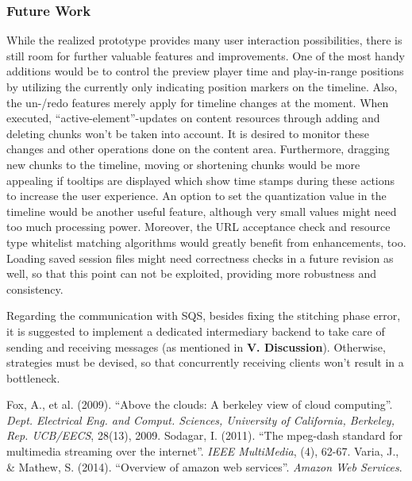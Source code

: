 \documentclass[conference]{IEEEtran}
\begin{document}
\subsubsection*{Future Work}
While the realized prototype provides many user interaction possibilities, there is still room for further valuable features and improvements.
One of the most handy additions would be to control the preview player time and play-in-range positions by utilizing the currently only indicating position markers on the timeline.
Also, the un-/redo features merely apply for timeline changes at the moment.
When executed, ``active-element''-updates on content resources through adding and deleting chunks won't be taken into account.
It is desired to monitor these changes and other operations done on the content area.
Furthermore, dragging new chunks to the timeline, moving or shortening chunks would be more appealing if tooltips are displayed which show time stamps during these actions to increase the user experience.
An option to set the quantization value in the timeline would be another useful feature, although very small values might need too much processing power.
Moreover, the URL acceptance check and resource type whitelist matching algorithms would greatly benefit from enhancements, too.
Loading saved session files might need correctness checks in a future revision as well, so that this point can not be exploited, providing more robustness and consistency.

Regarding the communication with SQS, besides fixing the stitching phase error, it is suggested to implement a dedicated intermediary backend to take care of sending and receiving messages (as mentioned in \textbf{V. Discussion}).
Otherwise, strategies must be devised, so that concurrently receiving clients won't result in a bottleneck.

\begin{thebibliography}{00}
 Fox, A., et al. (2009). ``Above the clouds: A berkeley view of cloud computing''. \textit{Dept. Electrical Eng. and Comput. Sciences, University of California, Berkeley, Rep. UCB/EECS}, 28(13), 2009. %
 Sodagar, I. (2011). ``The mpeg-dash standard for multimedia streaming over the internet''. \textit{IEEE MultiMedia}, (4), 62-67.
 Varia, J., \& Mathew, S. (2014). ``Overview of amazon web services''. \textit{Amazon Web Services}. %
\end{thebibliography}
\end{document}
